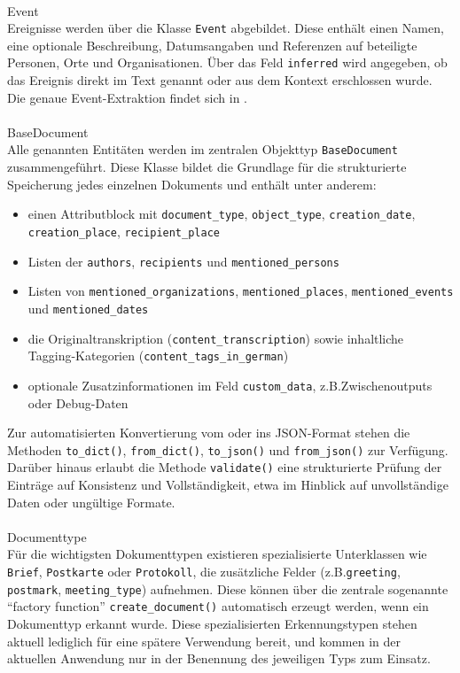 \documentclass[12pt, a4paper, ngerman, bidi=default]{article}
\makeatletter
\newcommand{\code}[1]{\colorbox{VeryLightGray}{\texttt{#1}}} %
\let\oldparagraph\paragraph%
\renewcommand{\paragraph}{
    \@ifstar%
      \xxxParagraphStar%
      \xxxParagraphNoStar%
 }
\newcommand{\xxxParagraphStar}[1]{\oldparagraph*{#1}\mbox{}}
\newcommand{\xxxParagraphNoStar}[1]{\oldparagraph{#1}\mbox{}}
\makeatother
\begin{document}
\paragraph{Event}\\
Ereignisse werden über die Klasse \code{Event} abgebildet. Diese enthält einen Namen, eine optionale Beschreibung, 
Datumsangaben und Referenzen auf beteiligte Personen, Orte und Organisationen. Über das Feld \code{inferred} wird angegeben, 
ob das Ereignis direkt im Text genannt oder aus dem Kontext erschlossen wurde. Die genaue Event-Extraktion findet sich 
in .

\paragraph{BaseDocument}\\
Alle genannten Entitäten werden im zentralen Objekttyp \code{BaseDocument} zusammengeführt. Diese Klasse bildet 
die Grundlage für die strukturierte Speicherung jedes einzelnen Dokuments und enthält unter anderem:
\begin{itemize}
\item einen Attributblock mit \code{document\_type}, \code{object\_type}, \code{creation\_date}, \code{creation\_place}, \code{recipient\_place}
\item Listen der \code{authors}, \code{recipients} und \code{mentioned\_persons}
\item Listen von \code{mentioned\_organizations}, \code{mentioned\_places}, \code{mentioned\_events} und \code{mentioned\_dates}
\item die Originaltranskription (\code{content\_transcription}) sowie inhaltliche Tagging-Kategorien (\code{content\_tags\_in\_german})
\item optionale Zusatzinformationen im Feld \code{custom\_data}, z.B.Zwischenoutputs oder Debug-Daten
\end{itemize}

Zur automatisierten Konvertierung vom oder ins JSON-Format stehen die Methoden \code{to\_dict()}, \code{from\_dict()}, \code{to\_json()} und \code{from\_json()} zur Verfügung. Darüber hinaus erlaubt die Methode \code{validate()} eine strukturierte Prüfung der Einträge auf Konsistenz und Vollständigkeit, etwa im Hinblick auf unvollständige Daten oder ungültige Formate.

\paragraph{Documenttype}\\
Für die wichtigsten Dokumenttypen existieren spezialisierte Unterklassen wie \code{Brief}, 
\code{Postkarte} oder \code{Protokoll}, die zusätzliche Felder (z.B.\code{greeting}, \code{postmark}, \code{meeting\_type}) aufnehmen. 
Diese können über die zentrale sogenannte \enquote{factory function} \code{create\_document()} automatisch erzeugt werden, wenn ein Dokumenttyp erkannt wurde. 
Diese spezialisierten Erkennungstypen stehen aktuell lediglich für eine spätere Verwendung bereit, und kommen in der aktuellen Anwendung nur in der Benennung des jeweiligen Typs zum Einsatz.
\end{document}

